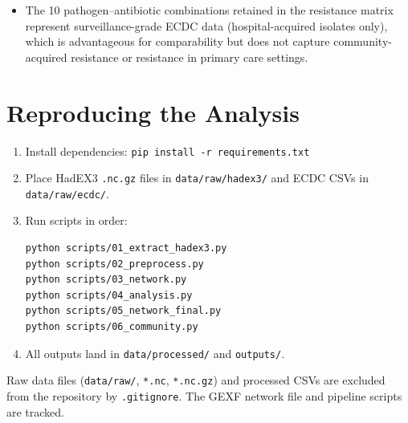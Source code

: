 \documentclass[12pt,a4paper]{article}
\begin{document}
\begin{itemize}
  \item The 10 pathogen--antibiotic combinations retained in the
    resistance matrix represent surveillance-grade ECDC data
    (hospital-acquired isolates only), which is advantageous for
    comparability but does not capture community-acquired resistance
    or resistance in primary care settings.
\end{itemize}

\section{Reproducing the Analysis}

\begin{enumerate}
  \item Install dependencies: \texttt{pip install -r requirements.txt}
  \item Place HadEX3 \texttt{.nc.gz} files in \texttt{data/raw/hadex3/}
    and ECDC CSVs in \texttt{data/raw/ecdc/}.
  \item Run scripts in order:
    \begin{verbatim}
python scripts/01_extract_hadex3.py
python scripts/02_preprocess.py
python scripts/03_network.py
python scripts/04_analysis.py
python scripts/05_network_final.py
python scripts/06_community.py
    \end{verbatim}
  \item All outputs land in \texttt{data/processed/} and
    \texttt{outputs/}.
\end{enumerate}

Raw data files (\texttt{data/raw/}, \texttt{*.nc}, \texttt{*.nc.gz})
and processed CSVs are excluded from the repository by \texttt{.gitignore}.
The GEXF network file and pipeline scripts are tracked.
\end{document}
